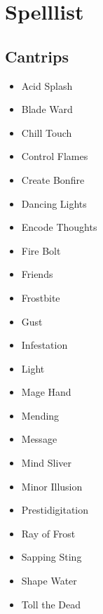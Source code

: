 \documentclass[a4paper,10pt,twoside,twocolumn, bg=print]{dndbook} %
\begin{document}
	\chapter{Spelllist}
		\section{Cantrips}
			\begin{itemize}
				\item Acid Splash
				\item Blade Ward
				\item Chill Touch
				\item Control Flames
				\item Create Bonfire
				\item Dancing Lights
				\item Encode Thoughts
				\item Fire Bolt
				\item Friends
				\item Frostbite
				\item Gust
				\item Infestation
				\item Light
				\item Mage Hand
				\item Mending
				\item Message
				\item Mind Sliver
				\item Minor Illusion
				\item Prestidigitation
				\item Ray of Frost
				\item Sapping Sting
				\item Shape Water
				\item Toll the Dead
			\end{itemize}
		\vfill\pagebreak
\end{document}
